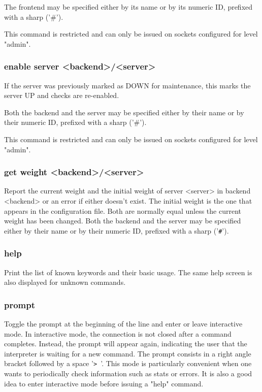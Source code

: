   The frontend may be specified either by its name or by its numeric ID,
  prefixed with a sharp ('\#').

  This command is restricted and can only be issued on sockets configured for
  level "admin".

\subsubsection[enable server]{enable server <backend>/<server>}
  If the server was previously marked as DOWN for maintenance, this marks the
  server UP and checks are re-enabled.

  Both the backend and the server may be specified either by their name or by
  their numeric ID, prefixed with a sharp ('\#').

  This command is restricted and can only be issued on sockets configured for
  level "admin".

\subsubsection[get weight]{get weight <backend>/<server>}
  Report the current weight and the initial weight of server <server> in
  backend <backend> or an error if either doesn't exist. The initial weight is
  the one that appears in the configuration file. Both are normally equal
  unless the current weight has been changed. Both the backend and the server
  may be specified either by their name or by their numeric ID, prefixed with a
  sharp ('\verb|#|').

\subsubsection[help]{help}
  Print the list of known keywords and their basic usage. The same help screen
  is also displayed for unknown commands.

\subsubsection[prompt]{prompt}
  Toggle the prompt at the beginning of the line and enter or leave interactive
  mode. In interactive mode, the connection is not closed after a command
  completes. Instead, the prompt will appear again, indicating the user that
  the interpreter is waiting for a new command. The prompt consists in a right
  angle bracket followed by a space '\verb|> |'. This mode is particularly convenient
  when one wants to periodically check information such as stats or errors.
  It is also a good idea to enter interactive mode before issuing a "help"
  command.

